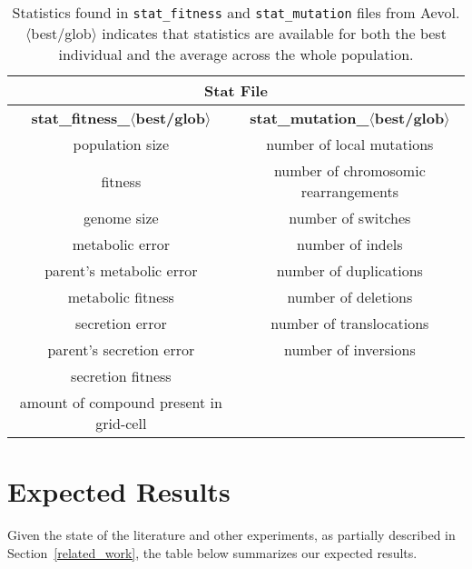 \begin{table}[H]
	\centering
	\begin{tabular}{ |c|c| }
		\hline
		\multicolumn{2}{|c|}{\textbf{Stat File}} \\
		\hline
		\textbf{stat\_fitness\_$\langle$best/glob$\rangle$} &
		\textbf{stat\_mutation\_$\langle$best/glob$\rangle$} \\
		\hline \hline
		population size & number of local mutations \\
		fitness & number of chromosomic rearrangements \\
		genome size & number of switches \\
		metabolic error & number of indels \\
		parent's metabolic error & number of duplications \\
		metabolic fitness & number of deletions \\
		secretion error & number of translocations \\
		parent's secretion error & number of inversions \\
		secretion fitness & \\ 
		amount of compound present in grid-cell & \\
		\hline
	\end{tabular}	
	\caption[Aevol's stats: fitness and mutation]{Statistics found in \texttt{stat\_fitness} and \texttt{stat\_mutation} files from Aevol. $\langle$best/glob$\rangle$ indicates that statistics are available for both the best individual and the average across the whole population.}
	\label{table:aevol_stats_fitness_and_mutation}
\end{table}
 
\section{Expected Results}\label{sec:expected_results}
Given the state of the literature and other experiments, as partially described in Section~\ref{related_work}, the table below summarizes our expected results. 

